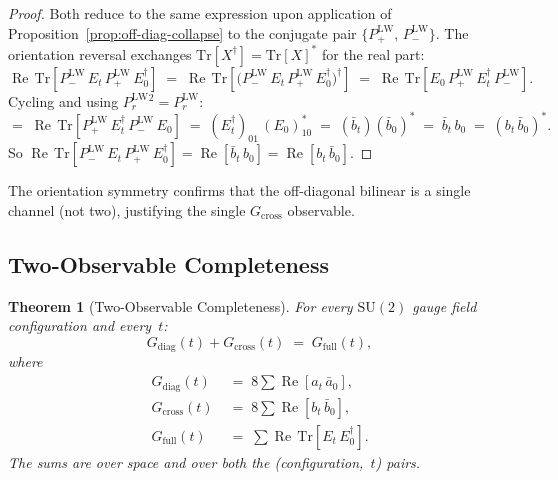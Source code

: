 \documentclass[12pt]{article}
\numberwithin{equation}{section}
\theoremstyle{plain}
\newtheorem{theorem}{Theorem}[section]
\theoremstyle{definition}
\theoremstyle{remark}
\newcommand{\su}{\mathrm{SU}}              %
\newcommand{\tr}{\mathrm{Tr}}              %
\newcommand{\Gdiag}{G_{\mathrm{diag}}}     %
\newcommand{\Gcross}{G_{\mathrm{cross}}}   %
\newcommand{\Gfull}{G_{\mathrm{full}}}     %
\newcommand{\PLW}{P^{\mathrm{LW}}}         %
\begin{document}
	\begin{proof}
		Both reduce to the same expression upon application of
		Proposition~\ref{prop:off-diag-collapse} to the conjugate pair
		$\{\PLW_+,\,\PLW_-\}$.  The orientation reversal exchanges
		$\tr[X^{\dagger}] = \tr[X]^{*}$ for the real part:
		\[
		\operatorname{Re}\,\tr\!\left[\PLW_-\, E_t\,\PLW_+\,
		E_0^{\dagger}\right]
		\;=\; \operatorname{Re}\,\tr\!\left[\bigl(\PLW_-\, E_t\,\PLW_+\,
		E_0^{\dagger}\bigr)^{\dagger}\right]
		\;=\; \operatorname{Re}\,\tr\!\left[E_0\,\PLW_+\, E_t^{\dagger}\,
		\PLW_-\right].
		\]
		Cycling and using $\PLW_r{}^{2} = \PLW_r$:
		\[
		=\; \operatorname{Re}\,\tr\!\left[\PLW_+\, E_t^{\dagger}\,
		\PLW_-\, E_0\right]
		\;=\; (E_t^{\dagger})_{01}\,(E_0)_{10}^{*}
		\;=\; (\bar{b}_t)(\bar{b}_0)^{*}
		\;=\; \bar{b}_t\,b_0
		\;=\; (b_t\,\bar{b}_0)^{*}.
		\]
		So
		$\operatorname{Re}\,\tr[\PLW_-\, E_t\,\PLW_+\, E_0^{\dagger}]
		= \operatorname{Re}[\bar{b}_t\,b_0]
		= \operatorname{Re}[b_t\,\bar{b}_0]$.
	\end{proof}
	
	The orientation symmetry confirms that the off-diagonal bilinear is a
	single channel (not two), justifying the single $\Gcross$ observable.
	
	\subsection{Two-Observable Completeness}
	\label{sec:theorem-completeness}
	
	\begin{theorem}[Two-Observable Completeness]
		\label{thm:two-obs-completeness}
		For every $\su(2)$ gauge field configuration and every~$t$:
		\begin{equation}
			\Gdiag(t) + \Gcross(t) \;=\; \Gfull(t),
			\label{eq:two-obs-completeness}
		\end{equation}
		where
		\begin{align}
			\Gdiag(t)  &\;=\; 8\sum
			\operatorname{Re}[a_t\,\bar{a}_0],
			\label{eq:Gdiag-def} \\
			\Gcross(t) &\;=\; 8\sum
			\operatorname{Re}[b_t\,\bar{b}_0],
			\label{eq:Gcross-def} \\
			\Gfull(t)  &\;=\; \sum
			\operatorname{Re}\,\tr\!\left[E_t\, E_0^{\dagger}\right].
			\label{eq:Gfull-def}
		\end{align}
		The sums are over space and over both the (configuration,~$t$)
		pairs.
	\end{theorem}
	
\end{document}
